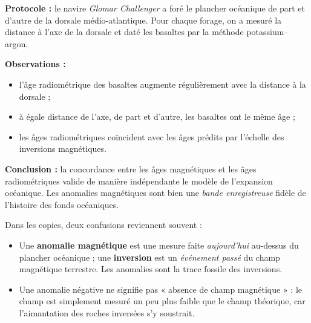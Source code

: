 \documentclass[11pt]{article}
\begin{document}
\begin{experience}
\textbf{Protocole :} le navire \emph{Glomar Challenger} a foré le plancher océanique de part et d'autre de la dorsale médio-atlantique. Pour chaque forage, on a mesuré la distance à l'axe de la dorsale et daté les basaltes par la méthode potassium--argon.\par
\textbf{Observations :}
\begin{itemize}
\item l'âge radiométrique des basaltes augmente régulièrement avec la distance à la dorsale ;
\item à égale distance de l'axe, de part et d'autre, les basaltes ont le même âge ;
\item les âges radiométriques coïncident avec les âges prédits par l'échelle des inversions magnétiques.
\end{itemize}
\textbf{Conclusion :} la concordance entre les âges magnétiques et les âges radiométriques valide de manière indépendante le modèle de l'expansion océanique. Les anomalies magnétiques sont bien une \emph{bande enregistreuse} fidèle de l'histoire des fonds océaniques.
\end{experience}

\begin{attention}
Dans les copies, deux confusions reviennent souvent :
\begin{itemize}
\item Une \textbf{anomalie magnétique} est une mesure faite \emph{aujourd'hui} au-dessus du plancher océanique ; une \textbf{inversion} est un \emph{événement passé} du champ magnétique terrestre. Les anomalies sont la trace fossile des inversions.
\item Une anomalie négative ne signifie pas « absence de champ magnétique » : le champ est simplement mesuré un peu plus faible que le champ théorique, car l'aimantation des roches inversées s'y soustrait.
\end{itemize}
\end{attention}
\end{document}
